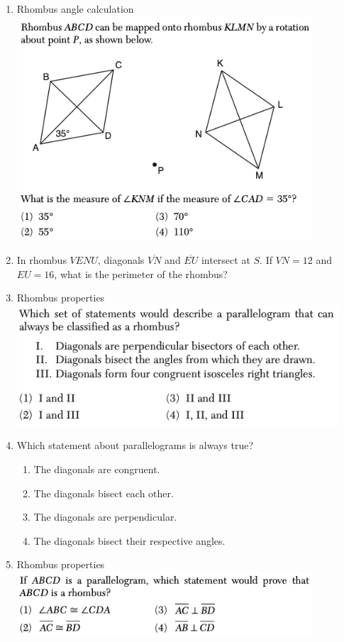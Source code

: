 \documentclass[12pt, oneside]{article}
\begin{document}
\begin{enumerate}
\item Rhombus angle calculation\\
\includegraphics[width=11cm]{R-4images/R-4RhombusK.png}

\item In rhombus $VENU$, diagonals $\overline{VN}$ and $\overline{EU}$ intersect at $S$. If $VN = 12$ and $EU = 16$, what is the perimeter of the rhombus?
\vspace{3.5cm}

\item Rhombus properties\\
\includegraphics[width=12cm]{R-4images/R-4RhombusA.png}

\newpage
\item Which statement about parallelograms is always true?
\begin{enumerate}
    \item The diagonals are congruent.
    \item The diagonals bisect each other.
    \item The diagonals are perpendicular.
    \item The diagonals bisect their respective angles.
\end{enumerate}

\item Rhombus properties\\
\includegraphics[width=11cm]{R-4images/R-4RhombusB.png}


\end{enumerate}
\end{document}
